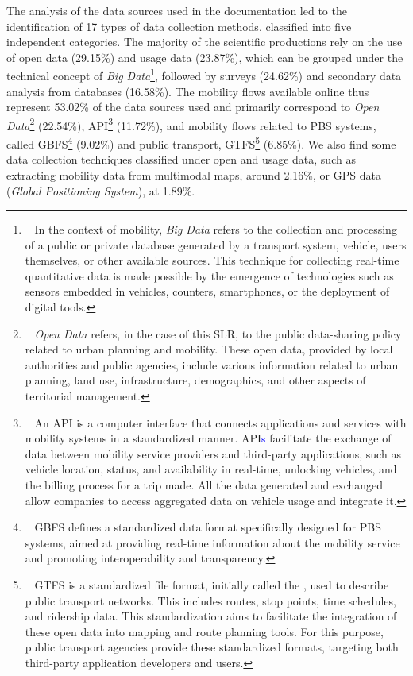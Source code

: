 \begin{refsegment}
The analysis of the data sources used in the documentation led to the identification of 17 types of data collection methods, classified into five independent categories. The majority of the scientific productions rely on the use of open data (29.15\%) and usage data (23.87\%), which can be grouped under the technical concept of \textsl{Big Data}\footnote{~
    In the context of mobility, \textsl{Big Data} refers to the collection and processing of a public or private database generated by a transport system, vehicle, users themselves, or other available sources. This technique for collecting real-time quantitative data is made possible by the emergence of technologies such as sensors embedded in vehicles, counters, smartphones, or the deployment of digital tools.
}, followed by surveys (24.62\%) and secondary data analysis from databases (16.58\%). The mobility flows available online thus represent 53.02\% of the data sources used and primarily correspond to \textsl{Open Data}\footnote{~
    \textsl{Open Data} refers, in the case of this \acrshort{SLR}, to the public data-sharing policy related to urban planning and mobility. These open data, provided by local authorities and public agencies, include various information related to urban planning, land use, infrastructure, demographics, and other aspects of territorial management.
} (22.54\%), \acrfull{API}\footnote{~
    An \acrshort{API} is a computer interface that connects applications and services with mobility systems in a standardized manner. \acrshort{API}\textcolor{blue}{s} facilitate the exchange of data between mobility service providers and third-party applications, such as vehicle location, status, and availability in real-time, unlocking vehicles, and the billing process for a trip made. All the data generated and exchanged allow companies to access aggregated data on vehicle usage and integrate it.
} (11.72\%), and mobility flows related to \acrshort{PBS} systems, called \acrfull{GBFS}\footnote{~
    \acrshort{GBFS} defines a standardized data format specifically designed for \acrshort{PBS} systems, aimed at providing real-time information about the mobility service and promoting interoperability and transparency.
} (9.02\%) and public transport, \acrfull{GTFS}\footnote{~
    \acrshort{GTFS} is a standardized file format, initially called the , used to describe public transport networks. This includes routes, stop points, time schedules, and ridership data. This standardization aims to facilitate the integration of these open data into mapping and route planning tools. For this purpose, public transport agencies provide these standardized formats, targeting both third-party application developers and users.
} (6.85\%). We also find some data collection techniques classified under open and usage data, such as extracting mobility data from multimodal maps, around 2.16\%, or \acrshort{GPS} data (\textsl{Global Positioning System}), at 1.89\%.%


\end{refsegment}
